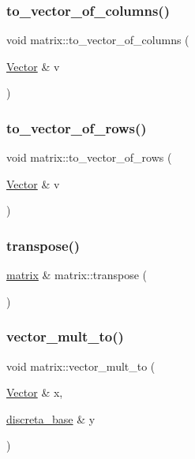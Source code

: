 \subsubsection{\texorpdfstring{to\+\_\+vector\+\_\+of\+\_\+columns()}{to\_vector\_of\_columns()}}
{\footnotesize\ttfamily void matrix\+::to\+\_\+vector\+\_\+of\+\_\+columns (\begin{DoxyParamCaption}\item[{\mbox{\hyperlink{class_vector}{Vector}} \&}]{v }\end{DoxyParamCaption})}

\mbox{\label{classmatrix_a46200f82b0e76394a82968029d5e5a61}} 
\subsubsection{\texorpdfstring{to\+\_\+vector\+\_\+of\+\_\+rows()}{to\_vector\_of\_rows()}}
{\footnotesize\ttfamily void matrix\+::to\+\_\+vector\+\_\+of\+\_\+rows (\begin{DoxyParamCaption}\item[{\mbox{\hyperlink{class_vector}{Vector}} \&}]{v }\end{DoxyParamCaption})}

\mbox{\label{classmatrix_a1d8064be96298b81e8e060f02b9cef3e}} 
\subsubsection{\texorpdfstring{transpose()}{transpose()}}
{\footnotesize\ttfamily \mbox{\hyperlink{classmatrix}{matrix}} \& matrix\+::transpose (\begin{DoxyParamCaption}{ }\end{DoxyParamCaption})}

\mbox{\label{classmatrix_a0e5dcee30e9e98346f389511c7700f1f}} 
\subsubsection{\texorpdfstring{vector\+\_\+mult\+\_\+to()}{vector\_mult\_to()}}
{\footnotesize\ttfamily void matrix\+::vector\+\_\+mult\+\_\+to (\begin{DoxyParamCaption}\item[{\mbox{\hyperlink{class_vector}{Vector}} \&}]{x,  }\item[{\mbox{\hyperlink{classdiscreta__base}{discreta\+\_\+base}} \&}]{y }\end{DoxyParamCaption})}

